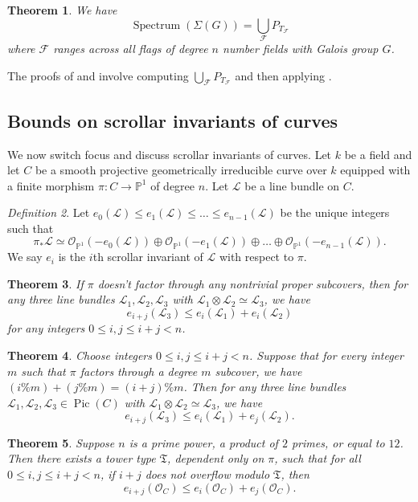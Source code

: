 \documentclass[letterpaper,10pt]{amsart}
\DeclareMathOperator{\Pic}{Pic}
\DeclareMathOperator{\Spe}{Spectrum}
\newcommand{\cO}{\mathcal{O}}      %
\newcommand{\PP}{\mathbb{P}}      %
\newcommand{\mfT}{\mathfrak{T}}
\newcommand{\cF}{\mathcal{F}}
\newcommand{\cL}{\mathcal{L}}
\newtheorem{theorem}{Theorem}[section]
\theoremstyle{definition}
\theoremstyle{remark}
\newtheorem{definition}[theorem]{Definition}
\begin{document}
\begin{theorem}
\label{thm:mult-spectrum}
We have
\[
	\Spe(\Sigma(G)) = \bigcup_{\cF}P_{T_{\cF}}
\]
where $\cF$ ranges across all flags of degree $n$ number fields with Galois group $G$.
\end{theorem}

The proofs of  and  involve computing $\bigcup_{\cF}P_{T_{\cF}}$ and then applying .

\subsection{Bounds on scrollar invariants of curves}
We now switch focus and discuss scrollar invariants of curves. Let $k$ be a field and let $C$ be a smooth projective geometrically irreducible curve over $k$ equipped with a finite morphism $\pi \colon C \rightarrow \PP^1$ of degree $n$. Let $\cL$ be a line bundle on $C$. 

\begin{definition}
Let $e_0(\cL) \leq e_1(\cL) \leq \dots \leq e_{n-1}(\cL)$ be the unique integers such that 
\[
	\pi_*\cL \simeq \cO_{\PP^1}(-e_0(\cL)) \oplus \cO_{\PP^1}(-e_1(\cL)) \oplus \dots \oplus \cO_{\PP^1}(-e_{n-1}(\cL)).
\]
We say $e_i$ is the $i$th scrollar invariant of $\cL$ with respect to $\pi$. 
\end{definition}

\begin{theorem}
\label{thm:bl-fn-field}
If $\pi$ doesn't factor through any nontrivial proper subcovers, then for any three line bundles $\cL_1,\cL_2,\cL_3$ with $\cL_1 \otimes \cL_2 \simeq \cL_3$, we have
\[
    e_{i + j}(\cL_3) \leq e_i(\cL_1) + e_i(\cL_2)
\]
for any integers $0 \leq i,j \leq i + j < n$.
\end{theorem}

\begin{theorem}
\label{thm:bound-subfield-fn-field}
Choose integers $0 \leq i,j \leq i + j < n$. Suppose that for every integer $m$ such that $\pi$ factors through a degree $m$ subcover, we have $(i\%m) + (j\%m) = (i + j)\%m$. Then for any three line bundles $\cL_1,\cL_2,\cL_3 \in \Pic(C)$ with $\cL_1 \otimes \cL_2 \simeq \cL_3$, we have
\[
   e_{i + j}(\cL_3) \leq e_i(\cL_1)+e_j(\cL_2).
\]
\end{theorem}

\begin{theorem}
\label{thm:containment-fn-field}
Suppose $n$ is a prime power, a product of $2$ primes, or equal to $12$.  Then there exists a tower type $\mfT$, dependent only on $\pi$, such that for all $0 \leq i,j \leq i + j < n$, if $i + j$ does not overflow modulo $\mfT$, then
\[
    e_{i + j}(\cO_C) \leq e_i(\cO_C) + e_j(\cO_C).
\]
\end{theorem}
\end{document}
